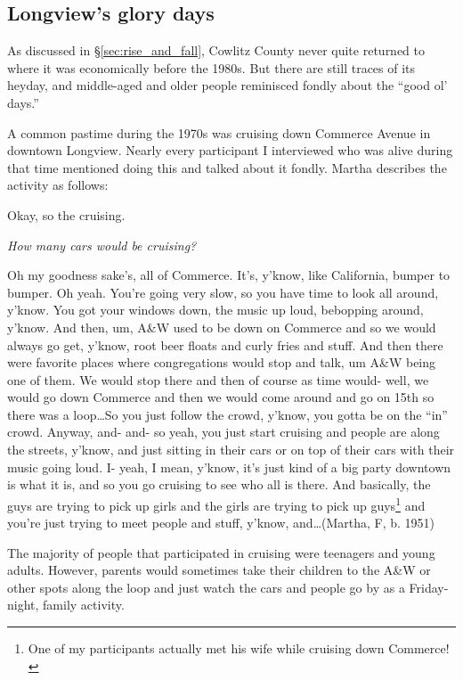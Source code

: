 \subsection{Longview's glory days}

As discussed in \S\ref{sec:rise_and_fall}, Cowlitz County never quite returned to where it was economically before the 1980s. But there are still traces of its heyday, and middle-aged and older people reminisced fondly about the ``good ol' days.''

A common pastime during the 1970s was cruising down Commerce Avenue in downtown Longview. Nearly every participant I interviewed who was alive during that time mentioned doing this and talked about it fondly. Martha describes the activity as follows:
\begin{num_quote}
    Okay, so the cruising.

    \textit{How many cars would be cruising?}

    Oh my goodness sake's, all of Commerce. It's, y'know, like California, bumper to bumper. Oh yeah. You're going very slow, so you have time to look all around, y'know. You got your windows down, the music up loud, bebopping around, y'know. And then, um, A\&W used to be down on Commerce and so we would always go get, y'know, root beer floats and curly fries and stuff. And then there were favorite places where congregations would stop and talk, um A\&W being one of them. We would stop there and then of course as time would- well, we would go down Commerce and then we would come around and go on 15th so there was a loop\ldots So you just follow the crowd, y'know, you gotta be on the ``in'' crowd. Anyway, and- and- so yeah, you just start cruising and people are along the streets, y'know, and just sitting in their cars or on top of their cars with their music going loud. I- yeah, I mean, y'know, it's just kind of a big party downtown is what it is, and so you go cruising to see who all is there. And basically, the guys are trying to pick up girls and the girls are trying to pick up guys\footnote{One of my participants actually met his wife while cruising down Commerce!} and you're just trying to meet people and stuff, y'know, and\ldots (Martha, F, b. 1951)
    \label{quote:cruising}
\end{num_quote}
The majority of people that participated in cruising were teenagers and young adults. However, parents would sometimes take their children to the A\&W or other spots along the loop and just watch the cars and people go by as a Friday-night, family activity.

